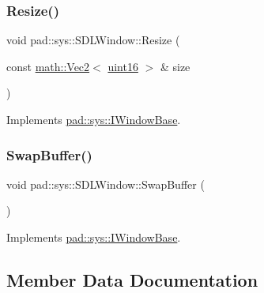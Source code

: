 \subsubsection{\texorpdfstring{Resize()}{Resize()}}
{\footnotesize\ttfamily void pad\+::sys\+::\+S\+D\+L\+Window\+::\+Resize (\begin{DoxyParamCaption}\item[{const \mbox{\hyperlink{namespacepad_1_1math_a9773bcf81aa2ddd829bc327d822c6552}{math\+::\+Vec2}}$<$ \mbox{\hyperlink{namespacepad_a03b9241a5f6a191da2faac64714e1038}{uint16}} $>$ \&}]{size }\end{DoxyParamCaption})\hspace{0.3cm}{\ttfamily [virtual]}}



Implements \mbox{\hyperlink{classpad_1_1sys_1_1_i_window_base_a19fff5f21c5a75082d8ca4e2491b269e}{pad\+::sys\+::\+I\+Window\+Base}}.

\mbox{\label{classpad_1_1sys_1_1_s_d_l_window_a991b47b499f3073e4d1962c2512e2ae8}} 
\subsubsection{\texorpdfstring{Swap\+Buffer()}{SwapBuffer()}}
{\footnotesize\ttfamily void pad\+::sys\+::\+S\+D\+L\+Window\+::\+Swap\+Buffer (\begin{DoxyParamCaption}{ }\end{DoxyParamCaption})\hspace{0.3cm}{\ttfamily [virtual]}}



Implements \mbox{\hyperlink{classpad_1_1sys_1_1_i_window_base_ac6fe9dea946b20c52ad8d9372e57e6c1}{pad\+::sys\+::\+I\+Window\+Base}}.



\subsection{Member Data Documentation}
\mbox{\label{classpad_1_1sys_1_1_s_d_l_window_a96971350b1dc47be7cd0ef7776ae095f}} 
